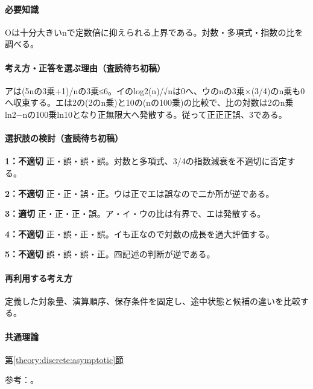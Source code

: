 \paragraph{必要知識} Oは十分大きいnで定数倍に抑えられる上界である。対数・多項式・指数の比を調べる。

\paragraph{考え方・正答を選ぶ理由（査読待ち初稿）} アは(5nの3乗+1)/nの3乗≤6。イのlog2(n)/√nは0へ、ウのnの3乗×(3/4)のn乗も0へ収束する。エは2の(2のn乗)と10の(nの100乗)の比較で、比の対数は2のn乗ln2−nの100乗ln10となり正無限大へ発散する。従って正正正誤、3である。

\paragraph{選択肢の検討（査読待ち初稿）}\mbox{}\par

\noindent\textbf{1：不適切} 正・誤・誤・誤。対数と多項式、3/4の指数減衰を不適切に否定する。\par

\noindent\textbf{2：不適切} 正・正・誤・正。ウは正でエは誤なので二か所が逆である。\par

\noindent\textbf{3：適切} 正・正・正・誤。ア・イ・ウの比は有界で、エは発散する。\par

\noindent\textbf{4：不適切} 正・誤・正・誤。イも正なので対数の成長を過大評価する。\par

\noindent\textbf{5：不適切} 誤・誤・誤・正。四記述の判断が逆である。\par

\paragraph{再利用する考え方} 定義した対象量、演算順序、保存条件を固定し、途中状態と候補の違いを比較する。

\paragraph{共通理論} \hyperref[theory:discrete:asymptotic]{第\ref*{theory:discrete:asymptotic}節}

\par 参考：\cite{mit_discrete2015}。

